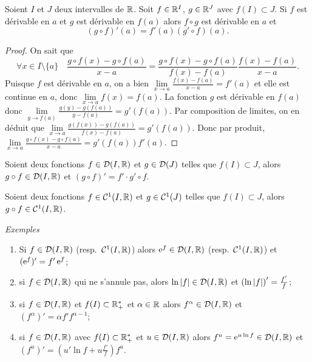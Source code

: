 \begin{theo}
  Soient \(I\) et \(J\) deux intervalles de \(\mathbb{R}\). Soit \(f \in \mathbb{R}^I\), \(g \in
  \mathbb{R}^J\) avec \(f(I) \subset J\). Si \(f\) est dérivable en \(a\) et \(g\) est
  dérivable en \(f(a)\) alors \(f \circ g\) est dérivable en \(a\) et
  \begin{equation}
    (g \circ f)'(a)=f'(a) (g' \circ f)(a).
  \end{equation}
\end{theo}
\begin{proof}
  On sait que
  \begin{equation}
    \forall x \in I\setminus\{a\} \quad \frac{g \circ f(x) -g \circ f(a)}{x-a} =
    \frac{g \circ f(x) -g \circ f(a)}{f(x)-f(a)} \frac{f(x)-f(a)}{x-a}.
  \end{equation}
  Puisque \(f\) est dérivable en \(a\), on a bien \(\lim\limits_{x \to a}
  \frac{f(x)-f(a)}{x-a} = f'(a)\) et elle est continue en \(a\), donc
  \(\lim\limits_{x \to a} f(x)=f(a)\). La fonction \(g\) est dérivable en
  \(f(a)\) donc \(\lim\limits_{y \to f(a)} \frac{g(y)-g(f(a))}{y-f(a)} =
  g'(f(a))\). Par composition de limites, on en déduit que \(\lim\limits_{x \to
  a} \frac{g(f(x))-g(f(a))}{f(x)-f(a)} = g'(f(a))\). Donc par produit,
  \(\lim\limits_{x \to a} \frac{g \circ f(x) -g \circ f(a)}{x-a} = g'(f(a))
  f'(a)\).
\end{proof}
\begin{corth}
  Soient deux fonctions \(f \in \mathcal{D}(I,\mathbb{R})\) et \(g \in \mathcal{D}(J)\) telles que
  \(f(I) \subset J\), alors \(g \circ f \in \mathcal{D}(I,\mathbb{R})\) et \((g\circ f)'=f'
  \cdot g' \circ f\).
\end{corth}
\begin{corth}
  Soient deux fonctions \(f \in \mathcal{C}^{1}(I,\mathbb{R})\) et \(g \in \mathcal{C}^{1}(J)\)
  telles que \(f(I) \subset J\), alors \(g \circ f \in \mathcal{C}^{1}(I,\mathbb{R})\).
\end{corth}

\emph{Exemples}

\begin{enumerate}
  \item Si \(f \in \mathcal{D}(I,\mathbb{R})\) (resp.\ \(\mathcal{C}^{1}(I,\mathbb{R})\)) alors \(\operatorname{e}^f
    \in \mathcal{D}(I,\mathbb{R})\) (resp.\ \(\mathcal{C}^{1}(I,\mathbb{R})\)) et \((\operatorname{e}^f)'=f' \operatorname{e}^f\);
  \item si \(f \in \mathcal{D}(I,\mathbb{R})\) qui ne s'annule pas, alors \(\ln \left\lvert f\right\rvert \in
    \mathcal{D}(I,\mathbb{R})\) et \(\left(\ln\left\lvert f\right\rvert \right)'=\frac{f'}{f}\);
  \item si \(f \in \mathcal{D}(I,\mathbb{R})\) et \(f(I) \subset \mathbb{R}_{+}^{*}\) et \(\alpha
    \in \mathbb{R}\) alors \(f^\alpha \in \mathcal{D}(I,\mathbb{R})\) et \((f^\alpha)'=\alpha f'
    f^{\alpha-1}\);
  \item si \(f \in \mathcal{D}(I,\mathbb{R})\) avec \(f(I) \subset \mathbb{R}_{+}^{*}\) et \(u \in
    \mathcal{D}(I,\mathbb{R})\) alors \(f^u=\operatorname{e}^{u \ln f} \in \mathcal{D}(I,\mathbb{R})\) et
    \((f^u)'=\left(u'\ln f+u \frac{f'}{f}\right) f^u\).
\end{enumerate}

